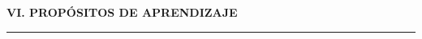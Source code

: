 \documentclass[11pt,a4paper]{article}
\begin{document}
\newpage %




\vspace{1.5em}
\noindent
{\color{azultexto}\bfseries\Large VI. PROPÓSITOS DE APRENDIZAJE}\\[-0.3em]
{\color{azultexto}\rule{\textwidth}{0.6pt}}


\vspace{0.8em}
\renewcommand{\arraystretch}{2.30}
\end{document}
